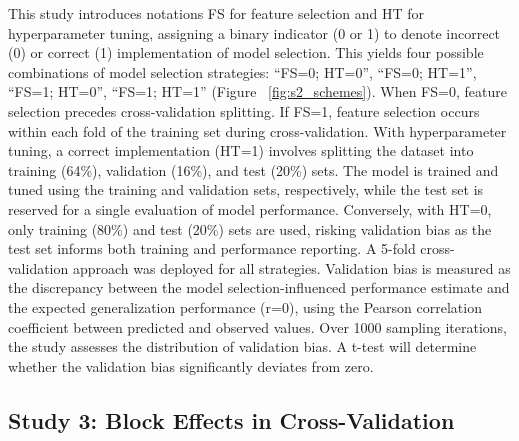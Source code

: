 This study introduces notations FS for feature selection and HT for hyperparameter tuning, assigning a binary indicator (0 or 1) to denote incorrect (0) or correct (1) implementation of model selection. This yields four possible combinations of model selection strategies: “FS=0; HT=0”, “FS=0; HT=1”, “FS=1; HT=0”, “FS=1; HT=1” (Figure ~\ref{fig:s2_schemes}). When FS=0, feature selection precedes cross-validation splitting. If FS=1, feature selection occurs within each fold of the training set during cross-validation. With hyperparameter tuning, a correct implementation (HT=1) involves splitting the dataset into training (64\%), validation (16\%), and test (20\%) sets. The model is trained and tuned using the training and validation sets, respectively, while the test set is reserved for a single evaluation of model performance. Conversely, with HT=0, only training (80\%) and test (20\%) sets are used, risking validation bias as the test set informs both training and performance reporting. A 5-fold cross-validation approach was deployed for all strategies.
Validation bias is measured as the discrepancy between the model selection-influenced performance estimate and the expected generalization performance (r=0), using the Pearson correlation coefficient between predicted and observed values. Over 1000 sampling iterations, the study assesses the distribution of validation bias. A t-test will determine whether the validation bias significantly deviates from zero.

\subsection{Study 3: Block Effects in Cross-Validation}

